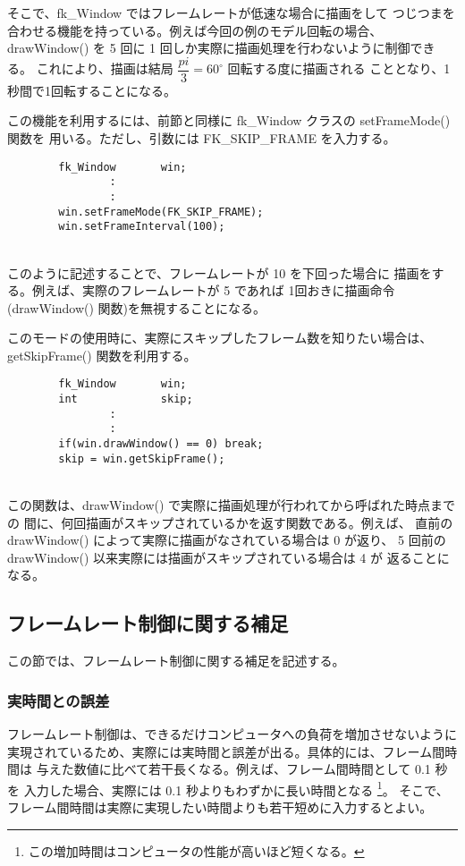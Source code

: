 そこで、fk\_Window ではフレームレートが低速な場合に描画をして
つじつまを合わせる機能を持っている。例えば今回の例のモデル回転の場合、
drawWindow() を 5 回に 1 回しか実際に描画処理を行わないように制御できる。
これにより、描画は結局 \(\dfrac{pi}{3} = 60^\circ\) 回転する度に描画される
こととなり、1秒間で1回転することになる。

この機能を利用するには、前節と同様に fk\_Window クラスの setFrameMode() 関数を
用いる。ただし、引数には FK\_SKIP\_FRAME を入力する。
\\
\begin{screen}
\begin{verbatim}
        fk_Window       win;
                :
                :
        win.setFrameMode(FK_SKIP_FRAME);
        win.setFrameInterval(100);
\end{verbatim}
\end{screen}
~ \\
このように記述することで、フレームレートが 10 を下回った場合に
描画をする。例えば、実際のフレームレートが 5 であれば
1回おきに描画命令 (drawWindow() 関数)を無視することになる。

このモードの使用時に、実際にスキップしたフレーム数を知りたい場合は、
getSkipFrame() 関数を利用する。
\\
\begin{screen}
\begin{verbatim}
        fk_Window       win;
        int             skip;
                :
                :
        if(win.drawWindow() == 0) break;
        skip = win.getSkipFrame();
\end{verbatim}
\end{screen}
~ \\
この関数は、drawWindow() で実際に描画処理が行われてから呼ばれた時点までの
間に、何回描画がスキップされているかを返す関数である。例えば、
直前の drawWindow() によって実際に描画がなされている場合は 0 が返り、
5 回前の drawWindow() 以来実際には描画がスキップされている場合は 4 が
返ることになる。

\subsection{フレームレート制御に関する補足}
この節では、フレームレート制御に関する補足を記述する。

\subsubsection*{実時間との誤差}
フレームレート制御は、できるだけコンピュータへの負荷を増加させないように
実現されているため、実際には実時間と誤差が出る。具体的には、フレーム間時間は
与えた数値に比べて若干長くなる。例えば、フレーム間時間として 0.1 秒を
入力した場合、実際には 0.1 秒よりもわずかに長い時間となる
\footnote{この増加時間はコンピュータの性能が高いほど短くなる。}。
そこで、フレーム間時間は実際に実現したい時間よりも若干短めに入力するとよい。

